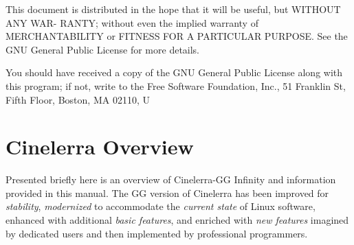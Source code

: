 This document is distributed in the hope that it will be useful, but WITHOUT ANY WAR-
RANTY; without even the implied warranty of MERCHANTABILITY or FITNESS FOR A
PARTICULAR PURPOSE. See the GNU General Public License for more details.

You should have received a copy of the GNU General Public License along with this program;
if not, write to the Free Software Foundation, Inc., 51 Franklin St, Fifth Floor, Boston, MA 02110, U

\section*{Cinelerra Overview}%
\label{sec:cinelerra_overview}

Presented briefly here is an overview of Cinelerra-GG Infinity and information provided in this manual. 
The GG version of Cinelerra has been improved for \emph{stability}, \emph{modernized} to accommodate the
\emph{current state} of Linux software, enhanced with additional \emph{basic features}, and enriched with \emph{new features} imagined by dedicated users and then implemented by professional programmers.

